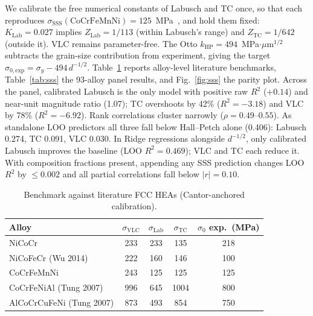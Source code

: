 \documentclass[11pt]{article}
\begin{document}
We calibrate the free numerical constants of Labusch and TC once, so that each reproduces $\sigma_\text{SSS}(\text{CoCrFeMnNi}) = 125$~\si{MPa}~\cite{Otto2013}, and hold them fixed: $K_\text{Lab} = 0.027$ implies $Z_\text{Lab} = 1/113$ (within Labusch's range) and $Z_\text{TC} = 1/642$ (outside it). VLC remains parameter-free. The Otto $k_\text{HP} = 494$~MPa$\cdot\mu$m$^{1/2}$ subtracts the grain-size contribution from experiment, giving the target $\sigma_{0,\text{exp}} = \sigma_y - 494\,d^{-1/2}$. Table~\ref{tab:sss_benchmark} reports alloy-level literature benchmarks, Table~\ref{tab:sss} the 93-alloy panel results, and Fig.~\ref{fig:sss} the parity plot. Across the panel, calibrated Labusch is the only model with positive raw $R^2$ ($+0.14$) and near-unit magnitude ratio (1.07); TC overshoots by 42\% ($R^2 = -3.18$) and VLC by 78\% ($R^2 = -6.92$). Rank correlations cluster narrowly ($\rho = 0.49$--$0.55$). As standalone LOO predictors all three fall below Hall--Petch alone (0.406): Labusch 0.274, TC 0.091, VLC 0.030. In Ridge regressions alongside $d^{-1/2}$, only calibrated Labusch improves the baseline (LOO $R^2 = 0.469$); VLC and TC each reduce it. With composition fractions present, appending any SSS prediction changes LOO $R^2$ by $\leq 0.002$ and all partial correlations fall below $|r| = 0.10$.

\begin{table}[htb]
\centering
\caption{Benchmark against literature FCC HEAs (Cantor-anchored calibration).}
\label{tab:sss_benchmark}
\small
\begin{tabular}{lcccc}
\toprule
Alloy & $\sigma_\text{VLC}$ & $\sigma_\text{Lab}$ & $\sigma_\text{TC}$ & $\sigma_0$ exp.\ (\si{MPa}) \\
\midrule
NiCoCr~\cite{Yoshida2017}        & 233 & 233 &  135 & 218 \\
NiCoFeCr (Wu 2014)               & 222 & 160 &  146 & 100 \\
CoCrFeMnNi~\cite{Otto2013}       & 243 & 125 &  125 & 125 \\
CoCrFeNiAl (Tung 2007)           & 996 & 645 & 1004 & 800 \\
AlCoCrCuFeNi (Tung 2007)         & 873 & 493 &  854 & 750 \\
\bottomrule
\end{tabular}
\end{table}
\end{document}
